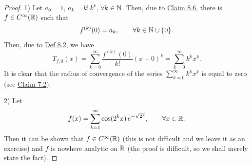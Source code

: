 \begin{proof}
1) Let $a_0=1$, $a_k=k!\,k^k$, $\forall k\in\mathbb{N}$.
Then, due to \hyperref[claim:8.6]{Claim 8.6}, there is $f\in C^\infty(\mathbb{R})$ such that
\[
f^{(k)}(0)=a_k,\qquad \forall k\in\mathbb{N}\cup\{0\}.
\]
Then, due to \hyperref[def:8.2]{Def 8.2}, we have
\[
T_{f,0}(x)
=\sum_{k=0}^{\infty}\frac{f^{(k)}(0)}{k!}(x-0)^k
=\sum_{k=0}^{\infty}k^k x^k.
\]
It is clear that the radius of convergence of the series $\sum_{k=0}^{\infty}k^kx^k$ is equal to zero (see \hyperref[claim:7.2]{Claim 7.2}).

2) Let
\[
f(x)=\sum_{k=1}^{\infty}\cos(2^k x)\,e^{-\sqrt{2^k}},
\qquad \forall x\in\mathbb{R}.
\]
Then it can be shown that $f\in C^\infty(\mathbb{R})$ (this is not difficult and we leave it as an exercise) and $f$ is nowhere analytic on $\mathbb{R}$ (the proof is difficult, so we shall merely state the fact).
\end{proof}

